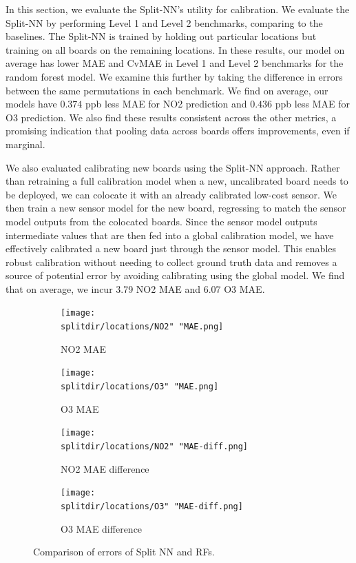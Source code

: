 \documentclass[journal abbreviation, manuscript]{copernicus}
\begin{document}
In this section, we evaluate the Split-NN's utility for calibration.
We evaluate the Split-NN by performing Level 1 and Level 2 benchmarks, comparing to the baselines. The Split-NN is trained by
holding out particular locations but training on all boards on the 
remaining locations.
In these results, our model on average has lower MAE and CvMAE in Level 1 and Level 2 benchmarks for the random forest model. We examine this further
by taking the difference in errors between the same permutations 
in each benchmark. We find on average, our models have $0.374$ ppb less MAE  
for NO2 prediction and $0.436$ ppb less MAE for O3 prediction.
We also find these results consistent across the other metrics,
a promising indication that pooling data across boards offers
improvements, even if marginal.

We also evaluated calibrating new boards using the Split-NN approach. Rather than retraining a full calibration model when a new, uncalibrated board needs to be deployed, we can colocate it with an already calibrated low-cost sensor. We then train a new sensor model for the new board, regressing to match the sensor model outputs from the colocated boards. Since the sensor model outputs intermediate values that are then fed into a global calibration model, we have effectively calibrated a new board just through the sensor model. This enables robust calibration without needing to collect ground truth data and removes a source of potential error by avoiding calibrating using the global model. We find that on average, we incur 3.79 NO2 MAE and 6.07 O3 MAE.

\begin{figure}[H]
\begin{subfigure}{0.49\textwidth}
\texttt{[image: \\splitdir/locations/NO2" "MAE.png]}
\caption{NO2 MAE}
\end{subfigure}
\begin{subfigure}{0.49\textwidth}
\texttt{[image: \\splitdir/locations/O3" "MAE.png]}
\caption{O3 MAE}
\end{subfigure}
\begin{subfigure}{0.49\textwidth}
\texttt{[image: \\splitdir/locations/NO2" "MAE-diff.png]}
\caption{NO2 MAE difference}
\end{subfigure}
\begin{subfigure}{0.49\textwidth}
\texttt{[image: \\splitdir/locations/O3" "MAE-diff.png]}
\caption{O3 MAE difference}
\end{subfigure}
\caption{Comparison of errors of Split NN and RFs.}
\label{fig:split-comparison}
\end{figure}
\end{document}
